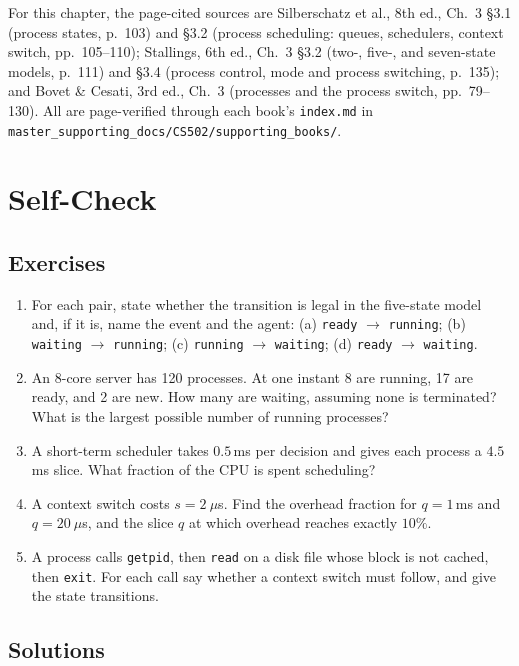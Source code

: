 \documentclass[11pt]{article}
\begin{document}
For this chapter, the page-cited sources are Silberschatz et al., 8th ed., Ch.~3
\S3.1 (process states, p.~103) and \S3.2 (process scheduling: queues,
schedulers, context switch, pp.~105--110); Stallings, 6th ed., Ch.~3 \S3.2
(two-, five-, and seven-state models, p.~111) and \S3.4 (process control, mode
and process switching, p.~135); and Bovet \& Cesati, 3rd ed., Ch.~3 (processes
and the process switch, pp.~79--130). All are page-verified through each book's
\texttt{index.md} in \texttt{master\_supporting\_docs/CS502/supporting\_books/}.

\section*{Self-Check}

\subsection*{Exercises}

\begin{enumerate}
  \item For each pair, state whether the transition is legal in the five-state
        model and, if it is, name the event and the agent: (a) \texttt{ready}
        $\to$ \texttt{running}; (b) \texttt{waiting} $\to$ \texttt{running};
        (c) \texttt{running} $\to$ \texttt{waiting}; (d) \texttt{ready} $\to$
        \texttt{waiting}.
  \item An 8-core server has 120 processes. At one instant 8 are running, 17
        are ready, and 2 are new. How many are waiting, assuming none is
        terminated? What is the largest possible number of running processes?
  \item A short-term scheduler takes $0.5$\,ms per decision and gives each
        process a $4.5$\,ms slice. What fraction of the CPU is spent
        scheduling?
  \item A context switch costs $s = 2\ \mu$s. Find the overhead fraction for
        $q = 1$\,ms and $q = 20\ \mu$s, and the slice $q$ at which overhead
        reaches exactly $10\%$.
  \item A process calls \texttt{getpid}, then \texttt{read} on a disk file
        whose block is not cached, then \texttt{exit}. For each call say
        whether a context switch must follow, and give the state transitions.
\end{enumerate}

\subsection*{Solutions}
\end{document}
